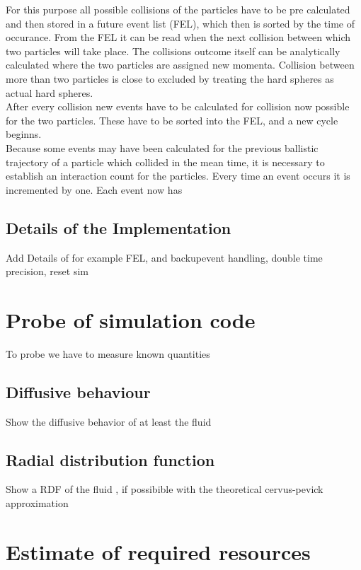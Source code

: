 For this purpose all possible collisions of the particles have to be pre calculated and then stored in a future event list (FEL), which then is sorted by the time of occurance. From the FEL it can be read when the next collision between which two particles will take place. The collisions outcome itself can be analytically calculated  where the two particles are assigned new momenta. Collision between more than two particles is close to excluded by treating the hard spheres as actual hard spheres.\\

After every collision new events have to be calculated for collision now possible for the two particles. These have to be sorted into the FEL, and a new cycle beginns.\\

Because some events may have been calculated for the previous ballistic trajectory of a particle which collided in the mean time, it is necessary to establish an interaction count for the particles. Every time an event occurs it is incremented by one. Each event now has  

\subsection{Details of the Implementation} 
\label{sec:implemetation}
Add Details of for example FEL, and backupevent handling, double time precision, reset sim

\section{Probe of simulation code}
\label{sec:probe}
To probe we have to measure known quantities
\subsection{Diffusive behaviour}
\label{sec:diffusion_probe}
Show the diffusive behavior of at least the fluid

\subsection{Radial distribution function}
\label{sec:RDF_prob}
Show a RDF of the fluid , if possibible with the theoretical cervus-pevick approximation


\section{Estimate of required resources}
\label{sec:resources}


